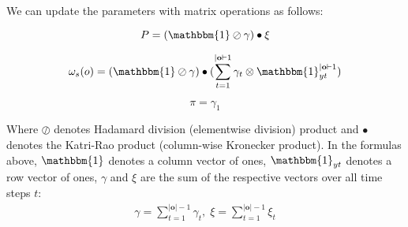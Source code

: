 We can update the parameters with matrix operations as follows:

\begin{equation}
    {P} = (\mathbbm{1} \oslash \gamma) \bullet \xi
    \label{eq:transition-probabilities-update}
\end{equation}

\begin{equation}
    {\omega}_s(o) = (\mathbbm{1} \oslash \gamma) \bullet (\sum_{t=1}^{|\mathbf{o}|-1} \gamma_t \otimes \mathbbm{1}_{yt}^{|\mathbf{o}|-1})
    \label{eq:omega-update}
\end{equation}

\begin{equation}
    {\pi} = {\gamma}_1
    \label{eq:initial-probabilities-update}
\end{equation}

Where $\oslash$ denotes Hadamard division (elementwise division) product and $\bullet$ denotes the Katri-Rao product (column-wise Kronecker product).
In the formulas above, $\mathbbm{1}$ denotes a column vector of ones, $\mathbbm{1}_{yt}$ denotes a row vector of ones, $\gamma$ and $\xi$ are the sum of the respective vectors over all time steps $t$:
\begin{align}
    \gamma = \sum_{t=1}^{|\mathbf{o}|-1} \gamma_t, \;
    \xi = \sum_{t=1}^{|\mathbf{o}|-1} \xi_t
\end{align} 

